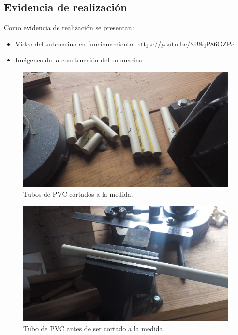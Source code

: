 \pagebreak

\subsection{Evidencia de realizaci\'on}
Como evidencia de realizaci\'on se presentan:
\begin{itemize}
 \item Video del submarino en funcionamiento: https://youtu.be/SB8qP86GZPc
 \item Im\'agenes de la construcci\'on del submarino
\end{itemize}

 \begin{figure}[!htbp]
 \centering
 \includegraphics [scale=0.1]
 {./img/20160327_150937.jpg}
 \caption{Tubos de PVC cortados a la medida.}
 \end{figure}

  \begin{figure}[!htbp]
 \centering
 \includegraphics [scale=0.1]
 {./img/20160327_150940.jpg}
 \caption{Tubo de PVC antes de ser cortado a la medida.}
 \end{figure}

